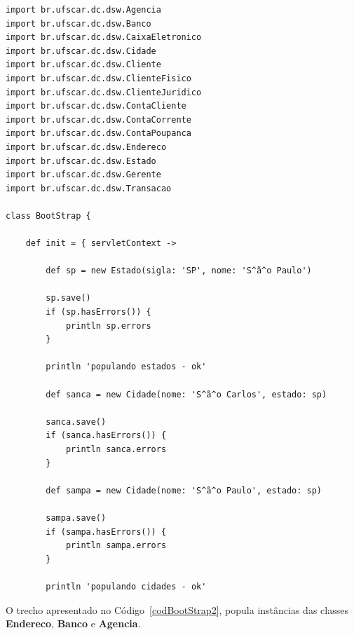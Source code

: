 \begin{lstlisting}[caption={\bf BootStrap.groovy (1)}, frame = trBL, float=htbp,
    label=codBootStrap1] 
import br.ufscar.dc.dsw.Agencia
import br.ufscar.dc.dsw.Banco
import br.ufscar.dc.dsw.CaixaEletronico
import br.ufscar.dc.dsw.Cidade
import br.ufscar.dc.dsw.Cliente
import br.ufscar.dc.dsw.ClienteFisico
import br.ufscar.dc.dsw.ClienteJuridico
import br.ufscar.dc.dsw.ContaCliente
import br.ufscar.dc.dsw.ContaCorrente
import br.ufscar.dc.dsw.ContaPoupanca
import br.ufscar.dc.dsw.Endereco
import br.ufscar.dc.dsw.Estado
import br.ufscar.dc.dsw.Gerente
import br.ufscar.dc.dsw.Transacao

class BootStrap {

    def init = { servletContext ->
       
        def sp = new Estado(sigla: 'SP', nome: 'S^ã^o Paulo')
        
        sp.save()
        if (sp.hasErrors()) {
            println sp.errors
        }
        
        println 'populando estados - ok'
        
        def sanca = new Cidade(nome: 'S^ã^o Carlos', estado: sp)
        
        sanca.save()
        if (sanca.hasErrors()) {
            println sanca.errors
        }
        
        def sampa = new Cidade(nome: 'S^ã^o Paulo', estado: sp)
        
        sampa.save()
        if (sampa.hasErrors()) {
            println sampa.errors
        }
        
        println 'populando cidades - ok'
\end{lstlisting}

\newpage

O  trecho  apresentado  no  Código~\ref{codBootStrap2},  popula  instâncias  das
classes {\bf Endereco}, {\bf Banco} e {\bf Agencia}.

